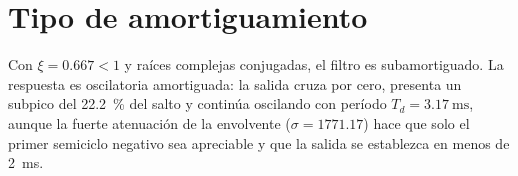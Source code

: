 \section{Tipo de amortiguamiento}

Con $\xi = \num{0.667} < 1$ y raíces complejas conjugadas, el filtro es subamortiguado. La respuesta es
oscilatoria amortiguada: la salida cruza por cero, presenta un subpico del \qty{22.2}{\percent} del salto
y continúa oscilando con período $T_d = \qty{3.17}{\milli\second}$, aunque la fuerte atenuación de la
envolvente ($\sigma = \num{1771.17}$) hace que solo el primer semiciclo negativo sea apreciable y que la
salida se establezca en menos de \qty{2}{\milli\second}.

